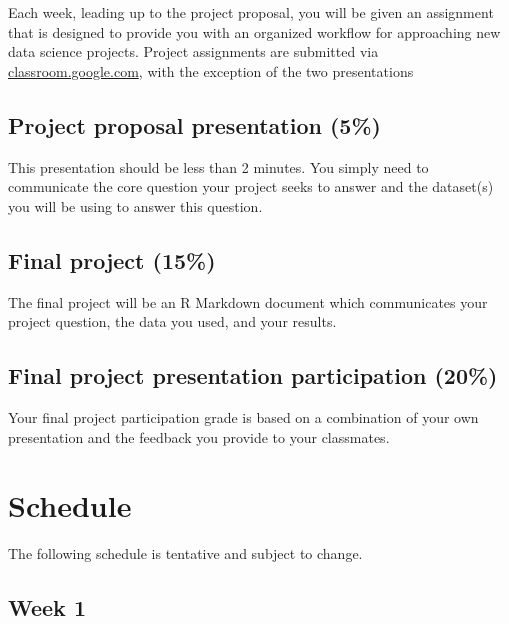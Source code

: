 \documentclass[]{book}
\begin{document}
Each week, leading up to the project proposal, you will be given an
assignment that is designed to provide you with an organized workflow
for approaching new data science projects. Project assignments are
submitted via \href{https//classroom.google.com}{classroom.google.com},
with the exception of the two presentations

\subsection*{Project proposal presentation
(5\%)}\label{project-proposal-presentation-5}

This presentation should be less than 2 minutes. You simply need to
communicate the core question your project seeks to answer and the
dataset(s) you will be using to answer this question.

\subsection*{Final project (15\%)}\label{final-project-15}

The final project will be an R Markdown document which communicates your
project question, the data you used, and your results.

\subsection*{Final project presentation participation
(20\%)}\label{final-project-presentation-participation-20}

Your final project participation grade is based on a combination of your
own presentation and the feedback you provide to your classmates.

\section*{Schedule}\label{schedule}

The following schedule is tentative and subject to change.

\subsection*{Week 1}\label{week-1}
\end{document}
